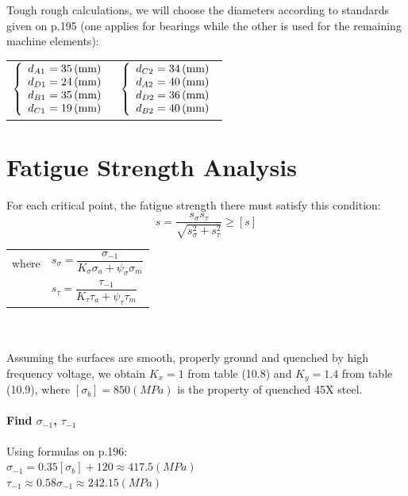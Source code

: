 Tough rough calculations, we will choose the diameters according to standards given on p.195 (one applies for bearings while the other is used for the remaining machine elements):

\begin{tabular}{p{7cm}p{7cm}}
	$
	\left\{ 
	\begin{array}{l@{{} = {}}l}
	d_{A1} & 35 \unit{(mm)}\\
	d_{D1} & 24 \unit{(mm)}\\
	d_{B1} & 35 \unit{(mm)}\\
	d_{C1} & 19 \unit{(mm)}\\
	\end{array}
	\right.
	$ &
	$
	\left\{ 
	\begin{array}{l@{{} = {}}l}
	d_{C2} & 34 \unit{(mm)}\\
	d_{A2} & 40 \unit{(mm)}\\
	d_{D2} & 36 \unit{(mm)}\\
	d_{B2} & 40 \unit{(mm)}\\
	\end{array}
	\right.
	$
\end{tabular}

\section{Fatigue Strength Analysis}
For each critical point, the fatigue strength there must satisfy this condition:
\[s=\dfrac{s_\sigma s_\tau}{\sqrt{s_\sigma^2+s_\tau^2}}\geq[s]\]
\begin{tabular}{ll}
	where & $ s_\sigma = \dfrac{\sigma_{-1}}{K_\sigma\sigma_a + \psi_\sigma\sigma_m}$\\
	& $ s_\tau = \dfrac{\tau_{-1}}{K_\tau\tau_a + \psi_\tau\tau_m}$
\end{tabular}\\\\
Assuming the surfaces are smooth, properly ground and quenched by high frequency voltage, we obtain $ K_x = 1 $ from table (10.8) and $ K_y = 1.4 $ from table (10.9), where $ [\sigma_b] = 850 \unit{(MPa)} $ is the property of quenched 45X steel.

\paragraph{Find $ \sigma_{-1}$, $ \tau_{-1} $} Using formulas on p.196:\\
$ \sigma_{-1} = 0.35[\sigma_b] + 120 \approx 417.5 \unit{(MPa)} $\\
$ \tau_{-1} \approx 0.58\sigma_{-1} \approx 242.15 \unit{(MPa)} $

